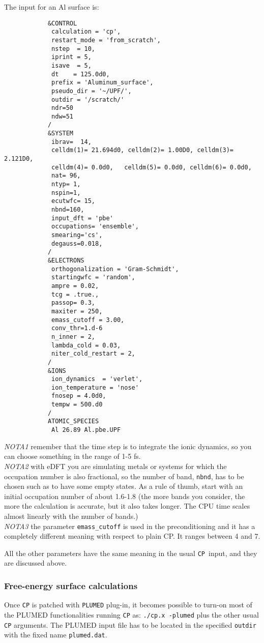 \documentclass[12pt,a4paper]{article}
\def\CP{\texttt{CP}}
\begin{document}
The input for an Al surface is:
\begin{verbatim}
            &CONTROL
             calculation = 'cp',
             restart_mode = 'from_scratch',
             nstep  = 10,
             iprint = 5,
             isave  = 5,
             dt    = 125.0d0,
             prefix = 'Aluminum_surface',
             pseudo_dir = '~/UPF/',
             outdir = '/scratch/'
             ndr=50
             ndw=51
            /
            &SYSTEM
             ibrav=  14,
             celldm(1)= 21.694d0, celldm(2)= 1.00D0, celldm(3)= 2.121D0,
             celldm(4)= 0.0d0,   celldm(5)= 0.0d0, celldm(6)= 0.0d0,
             nat= 96,
             ntyp= 1,
             nspin=1,
             ecutwfc= 15,
             nbnd=160,
             input_dft = 'pbe'
             occupations= 'ensemble',
             smearing='cs',
             degauss=0.018,
            /
            &ELECTRONS
             orthogonalization = 'Gram-Schmidt',
             startingwfc = 'random',
             ampre = 0.02,
             tcg = .true.,
             passop= 0.3,
             maxiter = 250,
             emass_cutoff = 3.00,
             conv_thr=1.d-6
             n_inner = 2,
             lambda_cold = 0.03,
             niter_cold_restart = 2,
            /
            &IONS
             ion_dynamics  = 'verlet',
             ion_temperature = 'nose'
             fnosep = 4.0d0,
             tempw = 500.d0
            /
            ATOMIC_SPECIES
             Al 26.89 Al.pbe.UPF
\end{verbatim}
{\em NOTA1}  remember that the time step is to integrate the ionic dynamics,
so you can choose something in the range of 1-5 fs. \\
{\em NOTA2} with eDFT you are simulating metals or systems for which the 
occupation number is also fractional, so the number of band, \texttt{nbnd}, has to 
be chosen such as to have some empty states. As a rule of thumb, start
with an initial occupation number of about 1.6-1.8 (the more bands you 
consider, the more the calculation is accurate, but it also takes longer.
The CPU time scales almost linearly with the number of bands.) \\
{\em NOTA3} the parameter \texttt{emass\_cutoff} is used in the preconditioning 
and it has a completely different meaning with respect to plain CP. 
It ranges between 4 and 7.

All the other parameters have the same meaning in the usual \CP\ input, 
and they are discussed above.

\subsubsection{Free-energy surface calculations}
Once \texttt{CP} is patched with \texttt{PLUMED} plug-in, it becomes possible to turn-on most of the PLUMED functionalities
running \texttt{CP} as: \texttt{./cp.x -plumed} plus the other usual \texttt{CP} arguments. The PLUMED input file has to be located in the specified \texttt{outdir} with
the fixed name \texttt{plumed.dat}.
\end{document}
